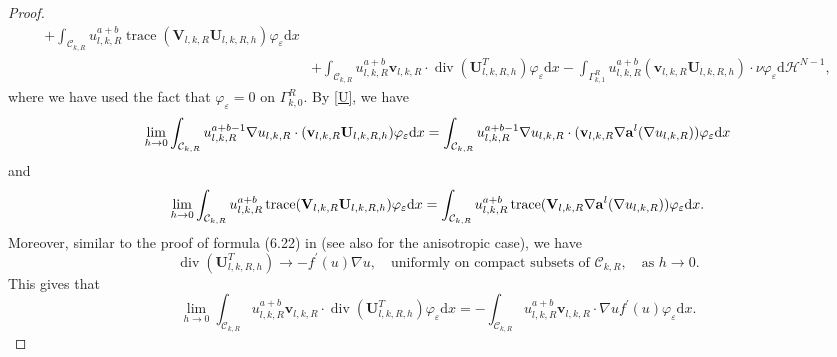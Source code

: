 \documentclass[12pt]{amsart}
\theoremstyle{definition}
\theoremstyle{remark}
\theoremstyle{conclusion}
\theoremstyle{conjecture}
\numberwithin{equation}{section}
\begin{document}
\begin{proof}
\begin{equation*}
\begin{aligned}
    +\int_{\mathcal{C}_{k,R}}u_{l,k,R}^{a+b}\operatorname{trace}(\mathbf{V}_{l,k,R}\mathbf{U}_{l,k,R,h})\varphi_{\varepsilon}\mathrm{d}x\\
    &+\int_{\mathcal{C}_{k,R}}u_{l,k,R}^{a+b}\mathbf{v}_{l,k,R}\cdot \operatorname{div}(\mathbf{U}_{l,k,R,h}^T)\varphi_{\varepsilon}\mathrm{d}x
    -\int_{\Gamma_{k,1}^R}u_{l,k,R}^{a+b}(\mathbf{v}_{l,k,R}\mathbf{U}_{l,k,R,h})\cdot\nu\varphi_{\varepsilon}\mathrm{d}\mathcal{H}^{N-1},
  \end{aligned}
\end{equation*}
where we have used the fact that $\varphi_{\varepsilon}=0$ on $\Gamma_{k,0}^R$. By \eqref{U}, we have
\begin{equation*}
 \lim\limits_{h\rightarrow0} \int_{\mathcal{C}_{k,R}}u_{l,k,R}^{a+b-1}\nabla u_{l,k,R}\cdot (\mathbf{v}_{l,k,R}\mathbf{U}_{l,k,R,h})\varphi_{\varepsilon}\mathrm{d}x=\int_{\mathcal{C}_{k,R}}u_{l,k,R}^{a+b-1}\nabla u_{l,k,R}\cdot (\mathbf{v}_{l,k,R}\nabla {\bf{a}}^l(\nabla u_{l,k,R}))\varphi_{\varepsilon}\mathrm{d}x
\end{equation*}
and
\begin{equation*}
 \lim\limits_{h\rightarrow0}\int_{\mathcal{C}_{k,R}}u_{l,k,R}^{a+b}\operatorname{trace}(\mathbf{V}_{l,k,R}\mathbf{U}_{l,k,R,h})\varphi_{\varepsilon}\mathrm{d}x=\int_{\mathcal{C}_{k,R}}u_{l,k,R}^{a+b}\operatorname{trace}(\mathbf{V}_{l,k,R}\nabla {\bf{a}}^l(\nabla u_{l,k,R}))\varphi_{\varepsilon}\mathrm{d}x.
\end{equation*}
Moreover, similar to the proof of formula (6.22) in \cite{SZ} (see also \cite[Formula (3.10)]{CHN} for the anisotropic case), we have
$$\operatorname{div}(\mathbf{U}_{l,k,R,h}^T)\rightarrow-f^{\prime}(u)\nabla u,\quad\text{uniformly on compact subsets of }\mathcal{C}_{k,R}, \quad\text{as}\,\,h\rightarrow0.$$
This gives that
\begin{equation*}
\lim\limits_{h\rightarrow0}\int_{\mathcal{C}_{k,R}}u_{l,k,R}^{a+b}\mathbf{v}_{l,k,R}\cdot \operatorname{div}(\mathbf{U}_{l,k,R,h}^T)\varphi_{\varepsilon}\mathrm{d}x=-\int_{\mathcal{C}_{k,R}}u_{l,k,R}^{a+b}\mathbf{v}_{l,k,R}\cdot \nabla u f^{\prime}(u)\varphi_{\varepsilon}\mathrm{d}x.
\end{equation*}



\end{proof}
\end{document}
